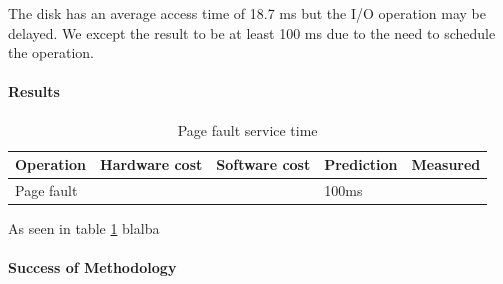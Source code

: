 The disk has an average access time of 18.7 ms but the I/O operation may be
delayed.
We except the result to be at least 100 ms due to the need to schedule the
operation.

\paragraph{Results}
\begin{table}[h]
\begin{center}
\begin{tabular}{| l | l | l | l | l |}
\hline
Operation 	& Hardware cost & Software cost & Prediction 	& Measured \\
\hline

Page fault	& 			&  			& 100ms		& 		 \\
\hline

\end{tabular}
\end{center}
\caption{Page fault service time\label{tab:page-fault}}
\end{table}

As seen in table \ref{tab:page-fault} blalba
\paragraph{Success of Methodology}

